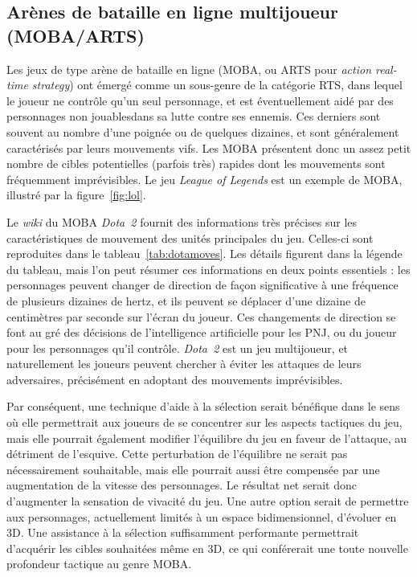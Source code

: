 	\subsection{Arènes de bataille en ligne multijoueur (MOBA/ARTS)}
	Les jeux de type arène de bataille en ligne (MOBA, ou ARTS pour \emph{action real-time strategy}) ont émergé comme un sous-genre de la catégorie RTS, dans lequel le joueur ne contrôle qu'un seul personnage, et est éventuellement aidé par des personnages non jouables\footnotemark dans sa lutte contre ses ennemis. Ces derniers sont souvent au nombre d'une poignée ou de quelques dizaines, et sont généralement caractérisés par leurs mouvements vifs. Les MOBA présentent donc un assez petit nombre de cibles potentielles (parfois très) rapides dont les mouvements sont fréquemment imprévisibles. Le jeu \emph{League of Legends} est un exemple de MOBA, illustré par la figure~\ref{fig:lol}.
	

	Le \emph{wiki} du MOBA \emph{Dota~2} fournit des informations très précises sur les caractéristiques de mouvement des unités principales du jeu\footnotemark. Celles-ci sont reproduites dans le tableau~\ref{tab:dotamoves}. Les détails figurent dans la légende du tableau, mais l'on peut résumer ces informations en deux points essentiels : les personnages peuvent changer de direction de façon significative à une fréquence de plusieurs dizaines de hertz, et ils peuvent se déplacer d'une dizaine de centimètres par seconde sur l'écran du joueur. Ces changements de direction se font au gré des décisions de l'intelligence artificielle pour les PNJ, ou du joueur pour les personnages qu'il contrôle. \emph{Dota~2} est un jeu multijoueur, et naturellement les joueurs peuvent chercher à éviter les attaques de leurs adversaires, précisément en adoptant des mouvements imprévisibles.
	
	Par conséquent, une technique d'aide à la sélection serait bénéfique dans le sens où elle permettrait aux joueurs de se concentrer sur les aspects tactiques du jeu, mais elle pourrait également modifier l'équilibre du jeu en faveur de l'attaque, au détriment de l'esquive. Cette perturbation de l'équilibre ne serait pas nécessairement souhaitable, mais elle pourrait aussi être compensée par une augmentation de la vitesse des personnages. Le résultat net serait donc d'augmenter la sensation de vivacité du jeu. Une autre option serait de permettre aux personnages, actuellement limités à un espace bidimensionnel, d'évoluer en 3D. Une assistance à la sélection suffisamment performante permettrait d'acquérir les cibles souhaitées même en 3D, ce qui conférerait une toute nouvelle profondeur tactique au genre MOBA.
	

